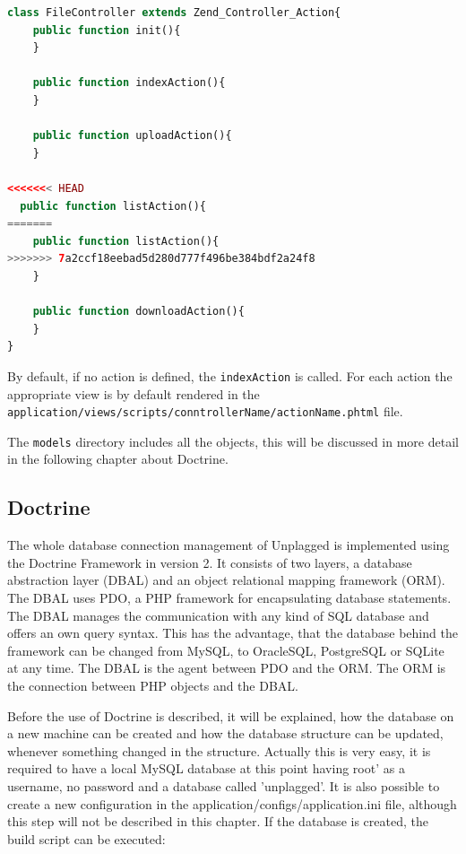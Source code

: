 \begin{lstlisting}[caption=Persisting an object to the database in Doctrine, label=list:persistingObjectDoctrine, language=PHP]
class FileController extends Zend_Controller_Action{
	public function init(){
	}

	public function indexAction(){
	}

	public function uploadAction(){
	}

<<<<<<< HEAD
  public function listAction(){
=======
	public function listAction(){
>>>>>>> 7a2ccf18eebad5d280d777f496be384bdf2a24f8
	}
  	
	public function downloadAction(){
	}
}
\end{lstlisting}

By default, if no action is defined, the \texttt{indexAction} is called. For each action the appropriate view is by 
default rendered in the \texttt{application/views/scripts/conntrollerName/actionName.phtml} file.

The \texttt{models} directory includes all the objects, this will be discussed in more detail in the following chapter about Doctrine.

\subsection{Doctrine}
The whole database connection management of Unplagged is implemented using the Doctrine Framework in version 2. 
It consists of two layers, a database abstraction layer (DBAL) and an object relational mapping framework
(ORM). The DBAL uses PDO, a PHP framework for encapsulating database statements. The DBAL manages the
communication with any kind of SQL database and offers an own query syntax. This has the advantage, that
the database behind the framework can be changed from MySQL, to OracleSQL, PostgreSQL or SQLite at any time.
The DBAL is the agent between PDO and the ORM. The ORM is the connection between PHP objects and the DBAL.

Before the use of Doctrine is described, it will be explained, how the database on a new machine can be created 
and how the database structure can be updated, whenever something changed in the structure. Actually this is very easy, 
it is required to have a local MySQL database at this point having root' as a username, no password and a database 
called 'unplagged'. It is also possible to create a new configuration in the 
application/configs/application.ini file, although this step will not be described in this chapter. If the database is 
created, the build script can be executed:

